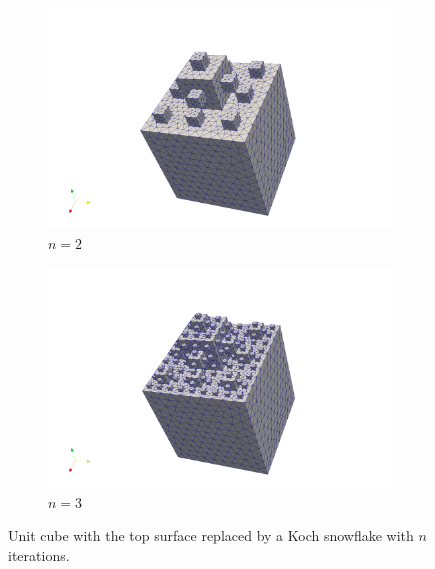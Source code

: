 \documentclass[12pt]{article}%
\theoremstyle{plain}
\numberwithin{equation}{section}
\begin{document}
  \begin{figure}[H]%
    \centering
         \begin{subfigure}[h]{0.45\linewidth}
         \caption{$n=2$}
\includegraphics[width=\linewidth]{figures/Ex2/Ex2_snow_cube_2.png}
\end{subfigure}
 \begin{subfigure}[h]{0.45\linewidth}
 \caption{$n=3$}
\includegraphics[width=\linewidth]{figures/Ex2/Ex2_snow_cube_3.png}
\end{subfigure}
  \caption{Unit cube with the top surface replaced by a Koch snowflake with $n$ iterations.}
  \label{fig:snow_3d}
 \end{figure}
\end{document}
